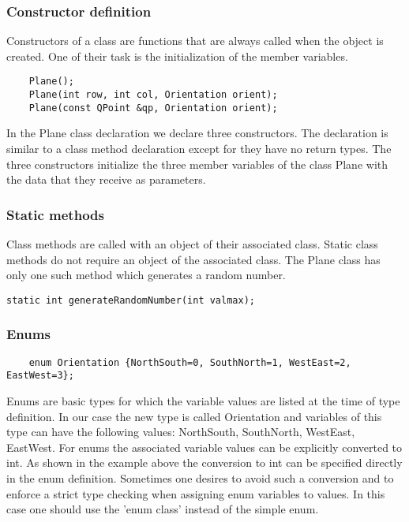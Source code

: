 \documentclass{article}
\begin{document}
\subsubsection {Constructor definition}
Constructors of a class are functions that are always called when the object is created. One of their task is the initialization of the member variables.
\begin{lstlisting}
    Plane();
    Plane(int row, int col, Orientation orient);
    Plane(const QPoint &qp, Orientation orient);
\end{lstlisting}
In the Plane class declaration we declare three constructors. The declaration is similar to a class method declaration except for they have no return types. The three constructors initialize the three member variables of the class Plane with the data that they receive as parameters. 

\subsubsection {Static methods}
Class methods are called with an object of their associated class. Static class methods do not require an object of the associated class. The Plane class has only one such method which generates a random number.
\begin{lstlisting}
static int generateRandomNumber(int valmax);
\end{lstlisting}

\subsubsection {Enums}

\begin{lstlisting}
    enum Orientation {NorthSouth=0, SouthNorth=1, WestEast=2, EastWest=3};
\end{lstlisting}
Enums are basic types for which the variable values are listed at the time of type definition. In our case the new type is called Orientation and variables of this type can have the following values: NorthSouth, SouthNorth, WestEast, EastWest. For enums the associated variable values can be explicitly converted to int. As shown in the example above the conversion to int can be specified directly in the enum definition. Sometimes one desires to avoid such a conversion and to enforce a strict type checking when assigning enum variables to values. In this case one should use the 'enum class' instead of the simple enum.  
\end{document}

